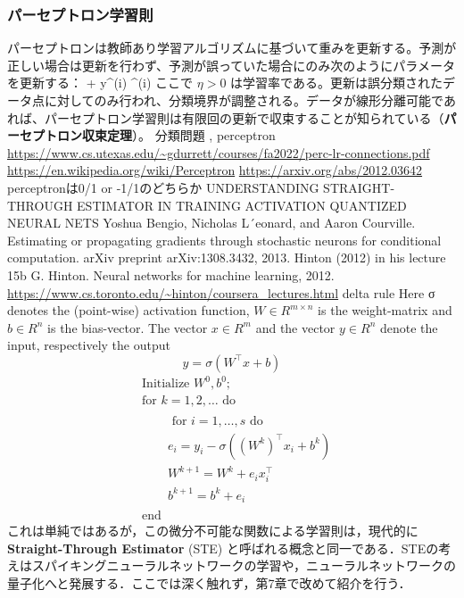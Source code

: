 \subsubsection{パーセプトロン学習則}
パーセプトロンは教師あり学習アルゴリズムに基づいて重みを更新する。予測が正しい場合は更新を行わず、予測が誤っていた場合にのみ次のようにパラメータを更新する：
 \leftarrow {} + \eta \cdot y^{(i)} ^{(i)}
ここで $\eta > 0$ は学習率である。更新は誤分類されたデータ点に対してのみ行われ、分類境界が調整される。データが線形分離可能であれば、パーセプトロン学習則は有限回の更新で収束することが知られている（\textbf{パーセプトロン収束定理}）。
分類問題
, perceptron
\url{https://www.cs.utexas.edu/~gdurrett/courses/fa2022/perc-lr-connections.pdf}
\url{https://en.wikipedia.org/wiki/Perceptron}
\url{https://arxiv.org/abs/2012.03642}
perceptronは0/1 or -1/1のどちらか
UNDERSTANDING STRAIGHT-THROUGH ESTIMATOR IN TRAINING ACTIVATION QUANTIZED NEURAL NETS
Yoshua Bengio, Nicholas L´eonard, and Aaron Courville. Estimating or propagating gradients through stochastic neurons for conditional computation. arXiv preprint arXiv:1308.3432, 2013.
Hinton (2012) in his lecture 15b
G. Hinton. Neural networks for machine learning, 2012.
\url{https://www.cs.toronto.edu/~hinton/coursera_lectures.html}
delta rule
Here σ denotes the (point-wise) activation function, $W \in R^{m\times n}$
is the weight-matrix and $b \in R^n$
is
the bias-vector. The vector $x \in R^m$ and the vector $y \in R^n$ denote the input, respectively the output
\begin{equation}
y=\sigma(W^\top x + b)
\end{equation}
\begin{align}
& \text { Initialize } W^0, b^0 \text {; } \\
& \text { for } k=1,2, \ldots \text { do } \\
& \qquad \begin{array}{|l}
\text { for } i=1, \ldots, s \text { do } \\
e_i=y_i-\sigma\left(\left(W^k\right)^{\top} x_i+b^k\right) \\
W^{k+1}=W^k+e_i x_i^{\top} \\
b^{k+1}=b^k+e_i
\end{array} \\
& \text { end }
\end{align}
これは単純ではあるが，この微分不可能な関数による学習則は，現代的に\textbf{Straight-Through Estimator} (STE) と呼ばれる概念と同一である．STEの考えはスパイキングニューラルネットワークの学習や，ニューラルネットワークの量子化へと発展する．ここでは深く触れず，第7章で改めて紹介を行う．
